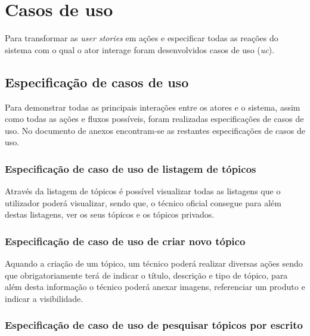 \section{Casos de uso}
Para transformar as \textit{user stories} em ações e especificar todas as reações do sistema com o qual o ator interage foram desenvolvidos casos de uso (\textit{\acrfull{uc}}).


\newpage

\subsection{Especificação de casos de uso}

Para demonstrar todas as principais interações entre os atores e o sistema, assim como todas as ações e fluxos possíveis, foram realizadas especificações de casos de uso. No documento de anexos encontram-se as restantes especificações de casos de uso.

\subsubsection{Especificação de caso de uso de listagem de tópicos}

Através da listagem de tópicos é possível visualizar todas as listagens que o utilizador poderá visualizar, sendo que, o técnico oficial consegue para além destas listagens, ver os seus tópicos e os tópicos privados.

%



\newpage

\subsubsection{Especificação de caso de uso de criar novo tópico}

Aquando a criação de um tópico, um técnico poderá realizar diversas ações sendo que obrigatoriamente terá de indicar o título, descrição e tipo de tópico, para além desta informação o técnico poderá anexar imagens, referenciar um produto e indicar a visibilidade.



\newpage

\subsubsection{Especificação de caso de uso de pesquisar tópicos por escrito}

